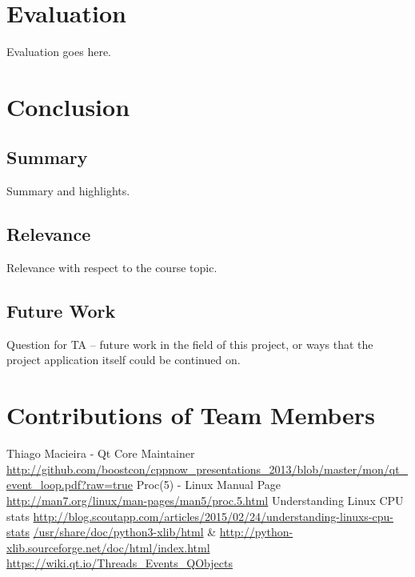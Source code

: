 \documentclass[12pt]{article}
\begin{document}
	\section{Evaluation}
	Evaluation goes here.
	
	\section{Conclusion}
	
	\subsection{Summary}
	Summary and highlights.
	
	\subsection{Relevance}
	Relevance with respect to the course topic.
	
	\subsection{Future Work}
	Question for TA -- future work in the field of this project, or ways that the project application itself could be continued on.
	
	
	\setcounter{secnumdepth}{0}
	\section{Contributions of Team Members}
	
	\begin{thebibliography}{3}
	 Thiago Macieira - Qt Core Maintainer \url{http://github.com/boostcon/cppnow_presentations_2013/blob/master/mon/qt_event_loop.pdf?raw=true}
	 Proc(5) - Linux Manual Page
	\url{http://man7.org/linux/man-pages/man5/proc.5.html}
	 Understanding Linux CPU stats \url{http://blog.scoutapp.com/articles/2015/02/24/understanding-linuxs-cpu-stats}
	 \url{/usr/share/doc/python3-xlib/html} \& \url{http://python-xlib.sourceforge.net/doc/html/index.html}
	 \url{https://wiki.qt.io/Threads_Events_QObjects}
	\end{thebibliography}{}
\end{document}
